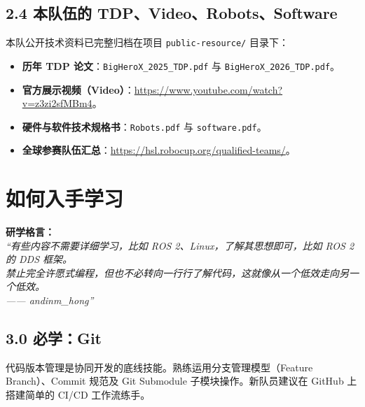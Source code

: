 \documentclass[11pt,a4paper]{ctexart}
\begin{document}
\subsection{2.4 本队伍的 TDP、Video、Robots、Software}
本队公开技术资料已完整归档在项目 \texttt{public-resource/} 目录下：
\begin{itemize}[leftmargin=*]
    \item \textbf{历年 TDP 论文}：\texttt{BigHeroX\_2025\_TDP.pdf} 与 \texttt{BigHeroX\_2026\_TDP.pdf}。
    \item \textbf{官方展示视频（Video）}：\url{https://www.youtube.com/watch?v=z3zi2sfMBm4}。
    \item \textbf{硬件与软件技术规格书}：\texttt{Robots.pdf} 与 \texttt{software.pdf}。
    \item \textbf{全球参赛队伍汇总}：\url{https://hsl.robocup.org/qualified-teams/}。
\end{itemize}

\newpage
\section{如何入手学习}

\begin{quotebox}
\textbf{研学格言：} \\
\textit{“有些内容不需要详细学习，比如 ROS 2、Linux，了解其思想即可，比如 ROS 2 的 DDS 框架。\\
禁止完全许愿式编程，但也不必转向一行行了解代码，这就像从一个低效走向另一个低效。\\
—— andinm\_hong”}
\end{quotebox}

\subsection{3.0 必学：Git}
代码版本管理是协同开发的底线技能。熟练运用分支管理模型（Feature Branch）、Commit 规范及 Git Submodule 子模块操作。新队员建议在 GitHub 上搭建简单的 CI/CD 工作流练手。
\end{document}

